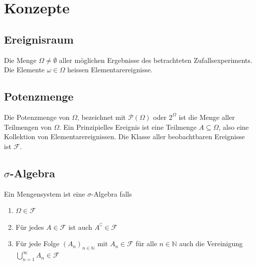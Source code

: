 \documentclass[8pt]{extarticle}
\newcommand{\N}{\mathbb{N}}
\newcommand{\F}{\mathcal{F}}
\begin{document}
\setlength{\columnseprule}{0.4pt}
\begin{multicols*}{3}



  \hypertarget{sec:0}{\section{Konzepte}}
  \subsection*{Ereignisraum}
  Die Menge $\Omega \neq \emptyset$ aller möglichen Ergebnisse
  des betrachteten Zufallsexperiments. Die Elemente $\omega \in \Omega$
  heissen Elementarereignisse.
  \subsection*{Potenzmenge}
  Die Potenzmenge von $\Omega$, bezeichnet mit $\mathcal{P}(\Omega)$ oder
  $2^\Omega$ ist die Menge aller Teilmengen von $\Omega$. Ein
  Prinzipielles Ereignis ist eine Teilmenge $A \subseteq \Omega$, also
  eine Kollektion von Elementarereignissen. Die Klasse aller beobachtbaren
  Ereignisse ist $\mathcal{F}$.
  \subsection*{$\sigma$-Algebra}
  Ein Mengensystem ist eine $\sigma$-Algebra falls
  \begin{enumerate}[label=(\arabic*)]
    \item $\Omega \in \mathcal{F}$
    \item Für jedes $A \in \mathcal{F}$ ist auch $A^\complement \in \mathcal{F}$
    \item Für jede Folge $(A_n)_{n \in \mathbb{N}}$ mit $A_n \in \mathcal{F}$
          für alle $n \in \N$ auch die Vereinigung
          $\bigcup_{n = 1}^\infty A_n \in \F$
  \end{enumerate}

\end{multicols*}
\end{document}
